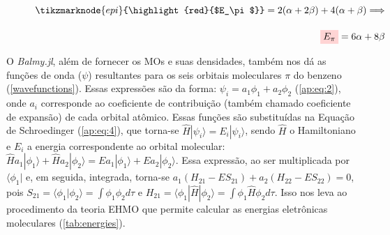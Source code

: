 \begin{figure}[htb]
\vspace{2\baselineskip}

\begin{equation}
\begin{split}
    \label{epi}
    \tikzmarknode{epi}{\highlight{red}{$E_\pi$}} = 2(\alpha + 2\beta) + 4(\alpha + \beta) \Longrightarrow \\[0.35cm] \highlight{red}{$E_\pi$} = 6\alpha + 8\beta
\end{split}
\end{equation}
\end{figure}

O \textit{Balmy.jl}, além de fornecer os \gls{MOs} e suas densidades, também nos dá as funções de onda ($\psi$) resultantes para os seis orbitais moleculares $\pi$ do benzeno (\autoref{wavefunctions}). Essas expressões são da forma: $\psi_i = a_1 \phi_1 + a_2 \phi_2$ (\autoref{ap:eq:2}), onde $a_i$ corresponde ao coeficiente de contribuição (também chamado coeficiente de expansão) de cada orbital atômico. Essas funções são substituídas na Equação de Schroedinger (\autoref{ap:eq:4}), que torna-se $\hat{H} |\psi_i \rangle = E_i |\psi_i \rangle$, sendo $\hat{H}$ o Hamiltoniano e $E_i$ a energia correspondente ao orbital molecular: $\hat{H}a_1|\phi_1\rangle + \hat{H}a_2|\phi_2\rangle = Ea_1|\phi_1\rangle + Ea_2|\phi_2\rangle$. Essa expressão, ao ser multiplicada por $\langle \phi_1 |$ e, em seguida, integrada, torna-se $a_1(H_{21} - ES_{21}) + a_2(H_{22} - ES_{22}) = 0$, pois $S_{21} = \langle \phi_1 | \phi_2 \rangle = \displaystyle \int \phi_1 \phi_2 d\tau$ e $H_{21} = \langle \phi_1 | \hat{H} | \phi_2 \rangle = \displaystyle \int \phi_1 \hat{H} \phi_2 d\tau$. Isso nos leva ao procedimento da teoria \gls{EHMO} que permite calcular as energias eletrônicas moleculares (\autoref{tab:energies}).

